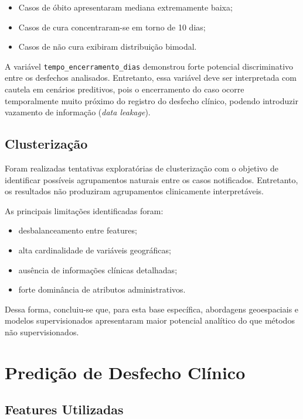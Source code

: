 \documentclass[11pt,a4paper]{article}
\begin{document}
\begin{itemize}
    \item Casos de óbito apresentaram mediana extremamente baixa;
    \item Casos de cura concentraram-se em torno de 10 dias;
    \item Casos de não cura exibiram distribuição bimodal.
\end{itemize}

A variável \texttt{tempo\_encerramento\_dias} demonstrou forte potencial discriminativo entre os desfechos analisados. Entretanto, essa variável deve ser interpretada com cautela em cenários preditivos, pois o encerramento do caso ocorre temporalmente muito próximo do registro do desfecho clínico, podendo introduzir vazamento de informação (\textit{data leakage}).

\subsection{Clusterização}

Foram realizadas tentativas exploratórias de clusterização com o objetivo de identificar possíveis agrupamentos naturais entre os casos notificados. Entretanto, os resultados não produziram agrupamentos clinicamente interpretáveis.

As principais limitações identificadas foram:

\begin{itemize}
    \item desbalanceamento entre features;
    \item alta cardinalidade de variáveis geográficas;
    \item ausência de informações clínicas detalhadas;
    \item forte dominância de atributos administrativos.
\end{itemize}

Dessa forma, concluiu-se que, para esta base específica, abordagens geoespaciais e modelos supervisionados apresentaram maior potencial analítico do que métodos não supervisionados.

\section{Predição de Desfecho Clínico}

\subsection{Features Utilizadas}
\end{document}
